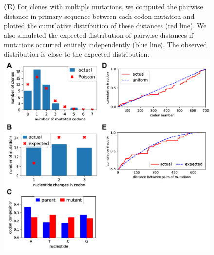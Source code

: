 \documentclass[9pt,lineno]{elife}
\begin{document}
\begin{figure}
{{\bf(E)} For clones with multiple mutations, we computed the pairwise distance in primary sequence between each codon mutation and plotted the cumulative distribution of these distances (red line). 
We also simulated the expected distribution of pairwise distances if mutations occurred entirely independently (blue line). 
The observed distribution is close to the expected distribution.
}{\includegraphics[width=\textwidth]{figures/sanger_sequencing_supp/sanger_sequencing_supp.pdf}}
\end{figure}
\FloatBarrier
\end{document}
